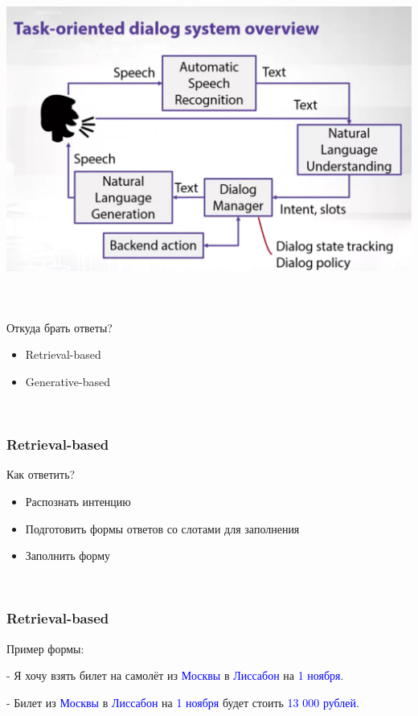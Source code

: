 \documentclass[t, 11pt]{beamer}
\begin{document}
\begin{frame}\
	\frametitle{\insertsection}
	\frametitle{\insertsubsection}
	
	
	\includegraphics[width=0.8\linewidth]{whole_system.png}
	
	
	
	
\end{frame}






\begin{frame}\
	\frametitle{\insertsection}
	\frametitle{\insertsubsection}
	Откуда брать ответы?
	
	\begin{itemize}
		\item Retrieval-based
		\item Generative-based
	\end{itemize}
\end{frame}

\begin{frame}\
	\frametitle{\insertsection}
	\frametitle{Retrieval-based}
	
	
	
	Как ответить?
	
	\begin{itemize}
		\item Распознать интенцию 
		\item Подготовить формы ответов со слотами для заполнения 
		\item Заполнить форму
	\end{itemize}
	
	
\end{frame}


\begin{frame}\
	\frametitle{\insertsection}
	\frametitle{Retrieval-based}
	
	
	
	Пример формы:
	
- Я хочу взять билет на самолёт из \textcolor{blue}{Москвы} в \textcolor{blue}{Лиссабон} на \textcolor{blue}{1
ноября}.


- Билет из \textcolor{blue}{Москвы} в \textcolor{blue}{Лиссабон} на \textcolor{blue}{1 ноября} будет стоить \textcolor{blue}{13 000
рублей}.
	
\end{frame}
\end{document}
